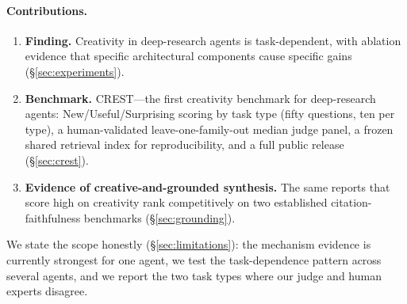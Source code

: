 \paragraph{Contributions.}
\begin{enumerate}
  \item \textbf{Finding.} Creativity in deep-research agents is task-dependent, with ablation
    evidence that specific architectural components cause specific gains (\S\ref{sec:experiments}).
  \item \textbf{Benchmark.} CREST---the first creativity benchmark for deep-research agents:
    New/Useful/Surprising scoring by task type (fifty questions, ten per type), a human-validated
    leave-one-family-out median judge panel, a frozen shared retrieval index for reproducibility,
    and a full public release
    (\S\ref{sec:crest}).
  \item \textbf{Evidence of creative-and-grounded synthesis.} The same reports that score high on
    creativity rank competitively on two established citation-faithfulness benchmarks
    (\S\ref{sec:grounding}).
\end{enumerate}

We state the scope honestly (\S\ref{sec:limitations}): the mechanism evidence is currently
strongest for one agent, we test the task-dependence pattern across several agents, and we
report the two task types where our judge and human experts disagree.
